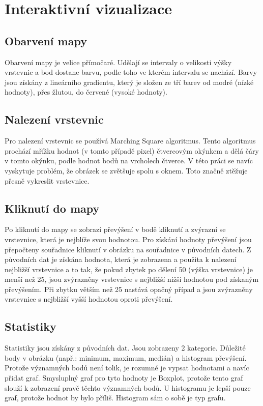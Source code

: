 \documentclass[12pt]{report}
\begin{document}
\section{Interaktivní vizualizace}
\subsection{Obarvení mapy}
Obarvení mapy je velice přímočaré. Udělají se intervaly o velikosti výšky vrstevnic a bod dostane
barvu, podle toho ve kterém intervalu se nachází. Barvy jsou získány z lineárního gradientu, který je složen
ze tří barev od modré (nízké hodnoty), přes žlutou, do červené (vysoké hodnoty).
\subsection{Nalezení vrstevnic}
Pro nalezení vrstevnic se používá Marching Square algoritmus. Tento algoritmus prochází mřížku hodnot (v
tomto případě pixel) čtvercovým okýnkem a dělá čáry v tomto okýnku, podle hodnot bodů na vrcholech čtverce.
V této práci se navíc vyskytuje problém, že obrázek se zvětšuje spolu s oknem. Toto značně ztěžuje přesně
vykreslit vrstevnice.
\subsection{Kliknutí do mapy}
Po kliknutí do mapy se zobrazí převýšení v bodě kliknutí a zvýrazní se vrstevnice, která je nejblíže svou
hodnotou. Pro získání hodnoty převýšení jsou přepočteny souřadnice kliknutí v obrázku na souřadnice v původních
datech. Z původních dat je získána hodnota, která je zobrazena a použita k nalezení nejbližší vrstevnice a to tak,
že pokud zbytek po dělení 50 (výška vrstevnice) je menší než 25, jsou zvýrazněny vrstevnice s nejbližší 
nižší hodnotou pod získaným převýšením. Při zbytku větším než 25 nastává opačný případ a jsou zvýrazněny
vrstevnice s nejbližší vyšší hodnotou oproti převýšení.
\subsection{Statistiky}
Statistiky jsou získány z původních dat. Jsou zobrazeny 2 kategorie. Důležité body v obrázku (např.: 
minimum, maximum, medián) a histogram převýšení. Protože významných bodů není tolik, je rozumné je
vypsat hodnotami a navíc přidat graf. Smysluplný graf pro tyto hodnoty je Boxplot, protože tento graf
slouží k zobrazení pravě těchto významných bodů. U histogramu je lepší pouze graf, protože hodnot by bylo
příliš. Histogram sám o sobě je typ grafu.
\end{document}
